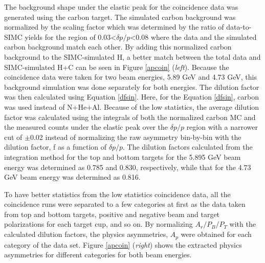 \documentclass[12pt]{article}
\begin{document}
The background shape under the elastic peak for the coincidence data was generated using the carbon target. The simulated carbon background was normalized by the scaling factor which was determined by the ratio of data-to-SIMC yields for the region of 0.03\textless$\delta p/p$\textless0.08 where the data and the simulated carbon background match each other. By adding this normalized carbon background to the SIMC-simulated H, a better match between the total data and SIMC-simulated H+C can be seen in Figure \ref{apcoin} (\emph{left}). Because the coincidence data were taken for two beam energies, 5.89 GeV and 4.73 GeV, this background simulation was done separately for both energies. The dilution factor was then calculated using Equation \eqref{dfsin}. Here, for the Equation \eqref{dfsin}, carbon was used instead of N+He+Al. Because of the low statistics, the average dilution factor was calculated using the integrals of both the normalized carbon MC and the measured counts under the elastic peak over the $\delta p/p$ region with a narrower cut of $\pm$0.02 instead of normalizing the raw asymmetry bin-by-bin with the dilution factor, f as a function of $\delta p/p$. The dilution factors calculated from the integration method for the top and bottom targets for the 5.895 GeV beam energy was determined as 0.785 and 0.830, respectively, while that for the 4.73 GeV beam energy was determined as 0.816.

To have better statistics from the low statistics coincidence data, all the coincidence runs were separated to a few categories at first as the data taken from top and bottom targets, positive and negative beam and target polarizations for each target cup, and so on. By normalizing $A_r/P_B/P_T$ with the calculated dilution factors, the physics asymmetries, $A_p$ were obtained for each category of the data set. Figure \ref{apcoin} (\emph{right}) shows the extracted physics asymmetries for different categories for both beam energies.
\end{document}
